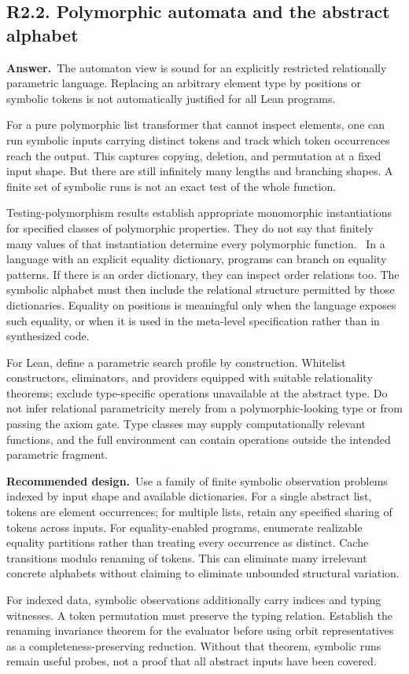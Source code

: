 \documentclass[11pt,a4paper]{article}
\newcommand{\qid}[3]{\subsection{#2. #3}\label{#1}}
\newcommand{\answer}{\noindent\textbf{Answer.}\ }
\newcommand{\proposal}{\noindent\textbf{Recommended design.}\ }
\theoremstyle{remark}
\begin{document}
\qid{q22}{R2.2}{Polymorphic automata and the abstract alphabet}
\answer The automaton view is sound for an explicitly restricted relationally parametric language. Replacing an arbitrary element type by positions or symbolic tokens is not automatically justified for all Lean programs.

For a pure polymorphic list transformer that cannot inspect elements, one can run symbolic inputs carrying distinct tokens and track which token occurrences reach the output. This captures copying, deletion, and permutation at a fixed input shape. But there are still infinitely many lengths and branching shapes. A finite set of symbolic runs is not an exact test of the whole function.

Testing-polymorphism results establish appropriate monomorphic instantiations for specified classes of polymorphic properties. They do not say that finitely many values of that instantiation determine every polymorphic function.~\cite{parametric} In a language with an explicit equality dictionary, programs can branch on equality patterns. If there is an order dictionary, they can inspect order relations too. The symbolic alphabet must then include the relational structure permitted by those dictionaries. Equality on positions is meaningful only when the language exposes such equality, or when it is used in the meta-level specification rather than in synthesized code.

For Lean, define a parametric search profile by construction. Whitelist constructors, eliminators, and providers equipped with suitable relationality theorems; exclude type-specific operations unavailable at the abstract type. Do not infer relational parametricity merely from a polymorphic-looking type or from passing the axiom gate. Type classes may supply computationally relevant functions, and the full environment can contain operations outside the intended parametric fragment.

\proposal Use a family of finite symbolic observation problems indexed by input shape and available dictionaries. For a single abstract list, tokens are element occurrences; for multiple lists, retain any specified sharing of tokens across inputs. For equality-enabled programs, enumerate realizable equality partitions rather than treating every occurrence as distinct. Cache transitions modulo renaming of tokens. This can eliminate many irrelevant concrete alphabets without claiming to eliminate unbounded structural variation.

For indexed data, symbolic observations additionally carry indices and typing witnesses. A token permutation must preserve the typing relation. Establish the renaming invariance theorem for the evaluator before using orbit representatives as a completeness-preserving reduction. Without that theorem, symbolic runs remain useful probes, not a proof that all abstract inputs have been covered.
\end{document}
